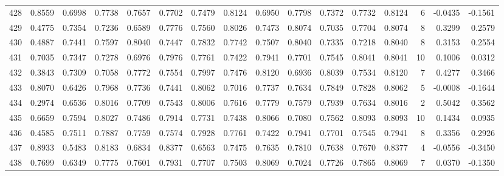 \begin{tabular}{lrrrrrrrrrrrrrrr}
428 &      0.8559 &  0.6998 &  0.7738 &  0.7657 &  0.7702 &  0.7479 &  0.8124 &  0.6950 &  0.7798 &  0.7372 &   0.7732 &     0.8124 &      6 &                   -0.0435 &                    -0.1561 \\
429 &      0.4775 &  0.7354 &  0.7236 &  0.6589 &  0.7776 &  0.7560 &  0.8026 &  0.7473 &  0.8074 &  0.7035 &   0.7704 &     0.8074 &      8 &                    0.3299 &                     0.2579 \\
430 &      0.4887 &  0.7441 &  0.7597 &  0.8040 &  0.7447 &  0.7832 &  0.7742 &  0.7507 &  0.8040 &  0.7335 &   0.7218 &     0.8040 &      8 &                    0.3153 &                     0.2554 \\
431 &      0.7035 &  0.7347 &  0.7278 &  0.6976 &  0.7976 &  0.7761 &  0.7422 &  0.7941 &  0.7701 &  0.7545 &   0.8041 &     0.8041 &     10 &                    0.1006 &                     0.0312 \\
432 &      0.3843 &  0.7309 &  0.7058 &  0.7772 &  0.7554 &  0.7997 &  0.7476 &  0.8120 &  0.6936 &  0.8039 &   0.7534 &     0.8120 &      7 &                    0.4277 &                     0.3466 \\
433 &      0.8070 &  0.6426 &  0.7968 &  0.7736 &  0.7441 &  0.8062 &  0.7016 &  0.7737 &  0.7634 &  0.7849 &   0.7828 &     0.8062 &      5 &                   -0.0008 &                    -0.1644 \\
434 &      0.2974 &  0.6536 &  0.8016 &  0.7709 &  0.7543 &  0.8006 &  0.7616 &  0.7779 &  0.7579 &  0.7939 &   0.7634 &     0.8016 &      2 &                    0.5042 &                     0.3562 \\
435 &      0.6659 &  0.7594 &  0.8027 &  0.7486 &  0.7914 &  0.7731 &  0.7438 &  0.8066 &  0.7080 &  0.7562 &   0.8093 &     0.8093 &     10 &                    0.1434 &                     0.0935 \\
436 &      0.4585 &  0.7511 &  0.7887 &  0.7759 &  0.7574 &  0.7928 &  0.7761 &  0.7422 &  0.7941 &  0.7701 &   0.7545 &     0.7941 &      8 &                    0.3356 &                     0.2926 \\
437 &      0.8933 &  0.5483 &  0.8183 &  0.6834 &  0.8377 &  0.6563 &  0.7475 &  0.7635 &  0.7810 &  0.7638 &   0.7670 &     0.8377 &      4 &                   -0.0556 &                    -0.3450 \\
438 &      0.7699 &  0.6349 &  0.7775 &  0.7601 &  0.7931 &  0.7707 &  0.7503 &  0.8069 &  0.7024 &  0.7726 &   0.7865 &     0.8069 &      7 &                    0.0370 &                    -0.1350 \\

\end{tabular}
